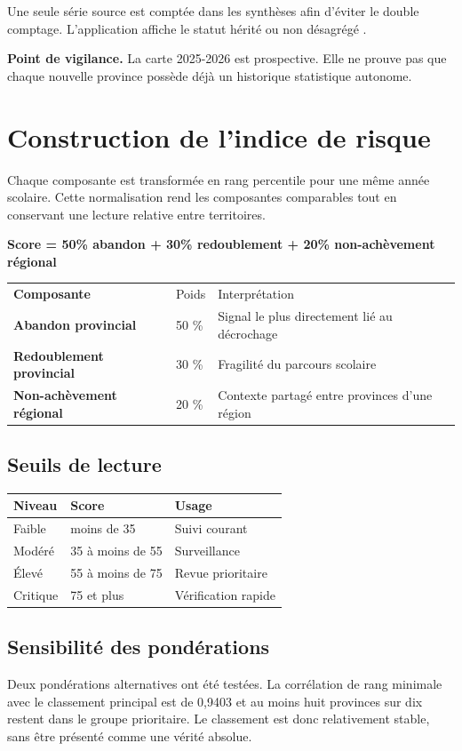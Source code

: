 \documentclass[12pt,a4paper]{article}
\newcommand{\note}[1]{\colorbox{SoftOrange}{\parbox{0.96\linewidth}{\textbf{\color{Orange}Point de vigilance.} #1}}}
\begin{document}
Une seule série source est comptée dans les synthèses afin d'éviter le double comptage. L'application affiche le statut \og hérité \fg{} ou \og non désagrégé \fg{}.

\note{La carte 2025-2026 est prospective. Elle ne prouve pas que chaque nouvelle province possède déjà un historique statistique autonome.}
\clearpage
\thispagestyle{fancy}

\section{Construction de l'indice de risque}
Chaque composante est transformée en rang percentile pour une même année scolaire. Cette normalisation rend les composantes comparables tout en conservant une lecture relative entre territoires.

\begin{center}
{\Large\bfseries\color{Blue}Score = 50\% abandon + 30\% redoublement + 20\% non-achèvement régional}
\end{center}

\begin{tabularx}{\textwidth}{>{\bfseries}p{4cm} p{2cm} X}
\rowcolor{Navy}\color{white}Composante & \color{white}Poids & \color{white}Interprétation\\
Abandon provincial & 50 \% & Signal le plus directement lié au décrochage\\
Redoublement provincial & 30 \% & Fragilité du parcours scolaire\\
Non-achèvement régional & 20 \% & Contexte partagé entre provinces d'une région\\
\end{tabularx}

\subsection{Seuils de lecture}
\begin{tabularx}{\textwidth}{p{3cm} p{3.5cm} X}
\toprule
Niveau & Score & Usage\\
\midrule
Faible & moins de 35 & Suivi courant\\
Modéré & 35 à moins de 55 & Surveillance\\
Élevé & 55 à moins de 75 & Revue prioritaire\\
Critique & 75 et plus & Vérification rapide\\
\bottomrule
\end{tabularx}

\subsection{Sensibilité des pondérations}
Deux pondérations alternatives ont été testées. La corrélation de rang minimale avec le classement principal est de 0,9403 et au moins huit provinces sur dix restent dans le groupe prioritaire. Le classement est donc relativement stable, sans être présenté comme une vérité absolue.
\clearpage
\thispagestyle{fancy}
\end{document}
